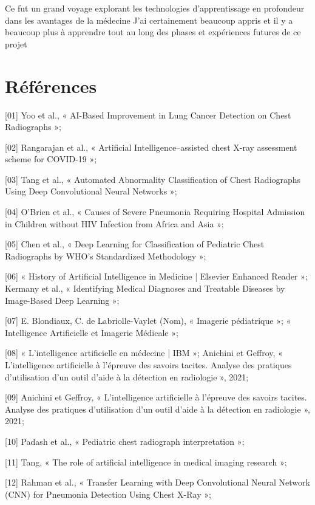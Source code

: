 \documentclass[12pt]{report}
\begin{document}
    Ce fut un grand voyage explorant les technologies d'apprentissage en profondeur dans les avantages de la médecine J'ai certainement beaucoup appris et il y a beaucoup plus à apprendre tout au long des phases et expériences futures de ce projet
    \clearpage

    \chapter*{Références}
    [01]     Yoo et al., « AI-Based Improvement in Lung Cancer Detection on Chest Radiographs »;

    [02]     Rangarajan et al., « Artificial Intelligence–assisted chest X-ray assessment scheme for COVID-19 »;
   
    [03]     Tang et al., « Automated Abnormality Classification of Chest Radiographs Using Deep Convolutional Neural Networks »;
   
    [04]     O’Brien et al., « Causes of Severe Pneumonia Requiring Hospital Admission in Children without HIV Infection from Africa and Asia »;
   
    [05]     Chen et al., « Deep Learning for Classification of Pediatric Chest Radiographs by WHO’s Standardized Methodology »;
   
    [06]     « History of Artificial Intelligence in Medicine | Elsevier Enhanced Reader »; Kermany et al., « Identifying Medical Diagnoses and Treatable Diseases by Image-Based Deep Learning »;
   
    [07]     E. Blondiaux, C. de Labriolle-Vaylet (Nom), « Imagerie pédiatrique »; « Intelligence Artificielle et Imagerie Médicale »;
   
    [08]     « L’intelligence artificielle en médecine | IBM »; Anichini et Geffroy, « L’intelligence artificielle à l’épreuve des savoirs tacites. Analyse des pratiques d’utilisation d’un outil d’aide à la détection en radiologie », 2021;
   
    [09]     Anichini et Geffroy, « L’intelligence artificielle à l’épreuve des savoirs tacites. Analyse des pratiques d’utilisation d’un outil d’aide à la détection en radiologie », 2021;
   
    [10]    Padash et al., « Pediatric chest radiograph interpretation »;
   
    [11]    Tang, « The role of artificial intelligence in medical imaging research »;
    
    [12]    Rahman et al., « Transfer Learning with Deep Convolutional Neural Network (CNN) for Pneumonia Detection Using Chest X-Ray »;
    
\end{document}
